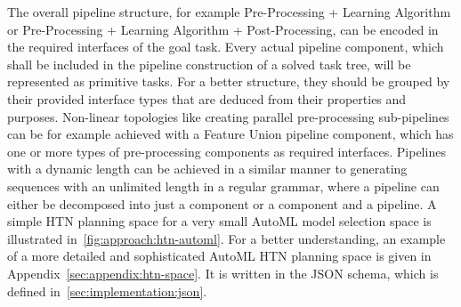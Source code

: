 The overall pipeline structure, for example Pre-Processing + Learning Algorithm or Pre-Processing + Learning Algorithm + Post-Processing, can be encoded in the required interfaces of the goal task.
Every actual pipeline component, which shall be included in the pipeline construction of a solved task tree, will be represented as primitive tasks.
For a better structure, they should be grouped by their provided interface types that are deduced from their properties and purposes.\newline
Non-linear topologies like creating parallel pre-processing sub-pipelines can be for example achieved with a Feature Union pipeline component, which has one or more types of pre-processing components as required interfaces.
Pipelines with a dynamic length can be achieved in a similar manner to generating sequences with an unlimited length in a regular grammar, where a pipeline can either be decomposed into just a component or a component and a pipeline.\newline
A simple HTN planning space for a very small AutoML model selection space is illustrated in~\ref{fig:approach:htn-automl}.
For a better understanding, an example of a more detailed and sophisticated AutoML HTN planning space is given in Appendix~\ref{sec:appendix:htn-space}.
It is written in the JSON schema, which is defined in~\ref{sec:implementation:json}.
